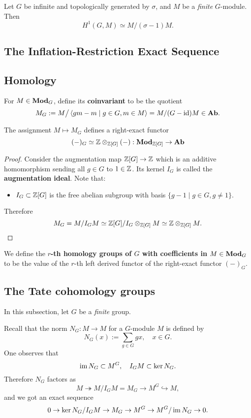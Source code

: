 \begin{example}
    Let $G$ be infinite and topologically generated by $\sigma$,
    and $M$ be a \textit{finite} $G$-module.
    Then \[H^1(G, M)\simeq M/(\sigma - 1)M.\]

\end{example}

\subsection{The Inflation-Restriction Exact Sequence}



\subsection{Homology}

For $M\in \mathbf{Mod}_G$, define its \textbf{coinvariant} to be the quotient
\[M_G := M\big/ \left\langle gm - m\mid g\in G, m\in M \right\rangle = M/(G - \operatorname{id})M\in \mathbf{Ab}.\]

\begin{lemma}
    The assignment $M\mapsto M_G$ defines a right-exact functor \[(-)_G\simeq \mathbb{Z}\otimes_{\mathbb{Z}[G]}(-) : \mathbf{Mod}_{\mathbb{Z}[G]}\to\mathbf{Ab}\]
\end{lemma}
\begin{proof}
Consider the augmentation map $\mathbb{Z}[G]\to\mathbb{Z}$ which is an additive homomorphism sending all $g\in G$ to $1\in\mathbb{Z}$.
Its kernel $I_G$ is called the \textbf{augmentation ideal}.
Note that:\begin{itemize}
    \item $I_G\subset\mathbb{Z}[G]$ is the free abelian subgroup with basis $\{g - 1 \mid g\in G, g\ne 1\}$.
\end{itemize}
Therefore \[M_G = M/I_GM\simeq \mathbb{Z}[G]/I_G\otimes_{\mathbb{Z}[G]} M\simeq \mathbb{Z}\otimes_{\mathbb{Z}[G]} M.\qedhere\]
\end{proof}
We define the \textbf{$r$-th homology groups of $G$ with coefficients in $M\in\mathbf{Mod}_G$} to be the value of the $r$-th left derived functor of the right-exact functor $(-)_G$.

\subsection{The Tate cohomology groups}

In this subsection, let $G$ be a \textit{finite} group.

Recall that the norm $N_G : M \to M$ for a $G$-module $M$ is defined by \[N_G(x) := \sum_{g\in G}gx,\quad x\in G.\]
One observes that \[\operatorname{im} N_G\subset M^G,\quad I_GM\subset \ker N_G.\]
Therefore $N_G$ factors as \[M\twoheadrightarrow M/I_GM = M_G\to M^G\hookrightarrow M,\] and we got an exact sequence \[0\to\ker N_G/I_GM\to M_G\to M^G\to M^G/\operatorname{im} N_G\to 0.\]

